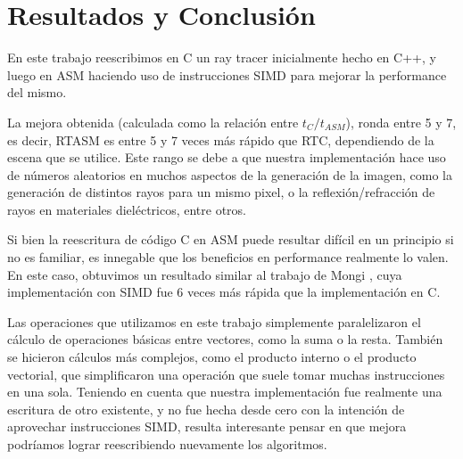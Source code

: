 \newpage
\section{Resultados y Conclusión} \label{sec:conclusion}

En este trabajo reescribimos en C un ray tracer inicialmente hecho en C++, y
luego en ASM haciendo uso de instrucciones SIMD para mejorar la performance del
mismo.

La mejora obtenida (calculada como la relación entre $t_C/t_{ASM}$), ronda entre
5 y 7, es decir, RTASM es entre 5 y 7 veces más rápido que RTC, dependiendo de
la escena que se utilice. Este rango se debe a que nuestra implementación hace
uso de números aleatorios en muchos aspectos de la generación de la imagen, como
la generación de distintos rayos para un mismo pixel, o la reflexión/refracción
de rayos en materiales dieléctricos, entre otros.

Si bien la reescritura de código C en ASM puede resultar difícil en un principio
si no es familiar, es innegable que los beneficios en performance realmente lo
valen. En este caso, obtuvimos un resultado similar al trabajo de Mongi
\cite{rtmartin}, cuya implementación con SIMD fue 6 veces más rápida que la
implementación en C.

Las operaciones que utilizamos en este trabajo simplemente paralelizaron el
cálculo de operaciones básicas entre vectores, como la suma o la resta. También
se hicieron cálculos más complejos, como el producto interno o el producto
vectorial, que simplificaron una operación que suele tomar muchas instrucciones
en una sola. Teniendo en cuenta que nuestra implementación fue realmente una
escritura de otro existente, y no fue hecha desde cero con la intención de
aprovechar instrucciones SIMD, resulta interesante pensar en que mejora
podríamos lograr reescribiendo nuevamente los algoritmos.

%
% 
